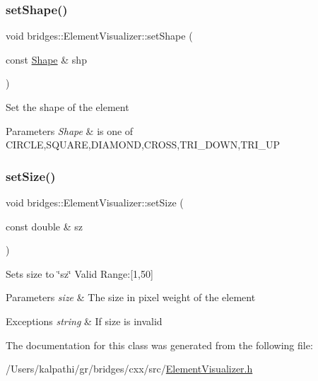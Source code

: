 \subsubsection{\texorpdfstring{setShape()}{setShape()}}
{\footnotesize\ttfamily void bridges\+::\+Element\+Visualizer\+::set\+Shape (\begin{DoxyParamCaption}\item[{const \mbox{\hyperlink{namespacebridges_a1b4050586bd708782ae0d4f3b06b9579}{Shape}} \&}]{shp }\end{DoxyParamCaption})\hspace{0.3cm}{\ttfamily [inline]}}

Set the shape of the element


\begin{DoxyParams}{Parameters}
{\em Shape} & is one of C\+I\+R\+C\+LE,S\+Q\+U\+A\+RE,D\+I\+A\+M\+O\+ND,C\+R\+O\+SS,T\+R\+I\+\_\+\+D\+O\+WN,T\+R\+I\+\_\+\+UP \\
\hline
\end{DoxyParams}
\mbox{\label{classbridges_1_1_element_visualizer_a6fc924e754008992b310a89d8d88fce9}} 
\subsubsection{\texorpdfstring{setSize()}{setSize()}}
{\footnotesize\ttfamily void bridges\+::\+Element\+Visualizer\+::set\+Size (\begin{DoxyParamCaption}\item[{const double \&}]{sz }\end{DoxyParamCaption})\hspace{0.3cm}{\ttfamily [inline]}}

Sets size to \char`\"{}sz\char`\"{} Valid Range\+:\mbox{[}1,50\mbox{]}


\begin{DoxyParams}{Parameters}
{\em size} & The size in pixel weight of the element \\
\hline
\end{DoxyParams}

\begin{DoxyExceptions}{Exceptions}
{\em string} & If size is invalid \\
\hline
\end{DoxyExceptions}


The documentation for this class was generated from the following file\+:\begin{DoxyCompactItemize}
\item 
/\+Users/kalpathi/gr/bridges/cxx/src/\mbox{\hyperlink{_element_visualizer_8h}{Element\+Visualizer.\+h}}\end{DoxyCompactItemize}
